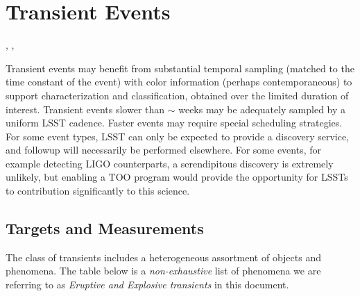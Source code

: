 \section{Transient Events}
\def\secname{\chpname:transients}\label{sec:\secname}

,
,

Transient events may benefit from substantial temporal sampling
(matched to the time constant of the event) with color information
(perhaps contemporaneous) to support characterization and
classification, obtained over the limited duration of interest.
Transient events slower than $\sim$ weeks may be adequately sampled by
a uniform LSST cadence.  Faster events may require special scheduling
strategies.  For some event types, LSST can only be expected to
provide a discovery service, and followup will necessarily be
performed elsewhere. 
For some events, for example detecting LIGO counterparts, a serendipitous discovery is extremely unlikely, but enabling a TOO program would provide the opportunity for LSSTs to contribution significantly to this science.



%



\subsection{Targets and Measurements}
\label{sec:\secname:targets}

The class of transients includes a heterogeneous assortment of objects and phenomena. The table below is a \emph{non-exhaustive} list of phenomena we are referring to as \emph{Eruptive and Explosive transients} in this document. 


